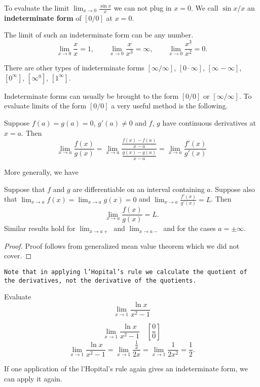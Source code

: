 \documentclass[../calc1-main.tex]{subfiles}
\begin{document}
To evaluate the limit $\lim_{x \to 0} \frac{\sin x}{x}$ we can not plug in $x=0$.
We call $\sin x/ x$ an \textbf{indeterminate form} of $[0/0]$ at $x=0$.

The limit of such an indeterminate form can be any number.
\[
  \lim_{x \to 0} \frac{x}{x} = 1, \qquad
  \lim_{x \to 0} \frac{x}{x^3} = \infty, \qquad
  \lim_{x \to 0} \frac{x^3}{x^2} = 0.
\]

There are other types of indeterminate forms $[\infty/\infty]$, $[0 \cdot \infty]$, $[\infty - \infty]$, $[0^{\infty}]$, $[\infty^0]$, $[1^{\infty}]$.

Indeterminate forms can usually be brought to the form $[0/0]$ or $[\infty/\infty]$. To evaluate limits of the form $[0/0]$ a very useful method is the following.

Suppose $f(a) = g(a) = 0$, $g'(a) \neq 0$ and $f$, $g$ have continuous derivatives at $x=a$. Then
\[
  \lim_{x \to a} \frac{f(x)}{g(x)} = \lim_{x \to a} \frac{\frac{f(x)-f(a)}{x-a}}{\frac{g(x)-g(a)}{x-a}} = \lim_{x \to a} \frac{f'(x)}{g'(x)}
\]

More generally, we have
\begin{theorem}
  Suppose that $f$ and $g$ are differentiable on an interval containing $a$. Suppose also that
  $\lim_{x \to a} f(x) = \lim_{x \to a} g(x) = 0$ and $\lim_{x \to a} \frac{f'(x)}{g'(x)} = L$. Then
  \[
    \lim_{x \to a} \frac{f(x)}{g(x)} = L.
  \]
  Similar results hold for $\lim_{x \to a+}$ and $\lim_{x \to a-}$ and for the cases $a= \pm \infty$.
\end{theorem}
\begin{proof}
  Proof follows from generalized mean value theorem which we did not cover.
\end{proof}

\texttt{Note that in applying l'Hopital's rule we calculate the quotient of the derivatives, not the derivative of the quotients.}

\begin{example}
  Evaluate
  \[
    \lim_{x \to 1} \frac{\ln x}{x^2-1}
  \]
\end{example}
\begin{solution}
  \[
    \lim_{x \to 1} \frac{\ln x}{x^2-1} \quad \left[ \frac{0}{0} \right]
  \]
  \[
    \lim_{x \to 1} \frac{\ln x}{x^2-1} =
    \lim_{x \to 1} \frac{\frac{1}{x}}{2x} =
    \lim_{x \to 1} \frac{1}{2x^2} = \frac{1}{2}.
  \]
\end{solution}

If one application of the l'Hopital's rule again gives an indeterminate form, we can apply it again.
\end{document}
